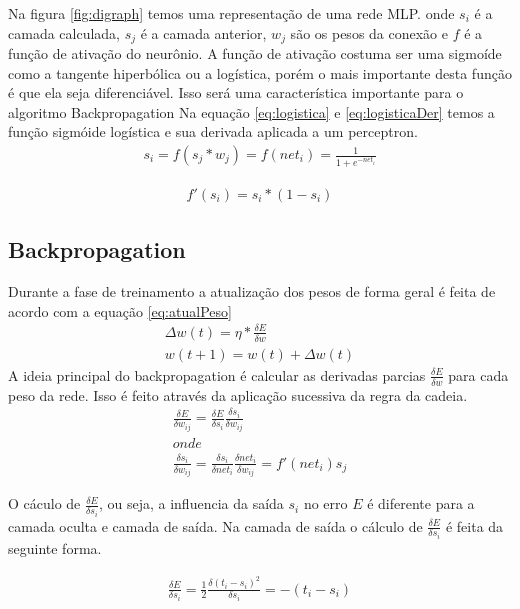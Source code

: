 \documentclass[
	article,			%
	11pt,				%
	oneside,			%
	a4paper,			%
	english,			%
	brazil,				%
	sumario=tradicional
	]{abntex2}
\begin{document}
Na figura \ref{fig:digraph} temos uma representação de uma rede MLP.
onde $s_i$ é a camada calculada, $s_j$ é a camada anterior, $w_j$ são os pesos
da conexão e $f$ é a função de ativação do neurônio. A função de ativação
costuma ser uma sigmoíde como a tangente hiperbólica ou a logística, porém o
mais importante desta função é que ela seja diferenciável. Isso será uma
característica importante para o algoritmo Backpropagation Na equação
\ref{eq:logistica} e \ref{eq:logisticaDer} temos a função sigmóide logística e
sua derivada aplicada a um perceptron.
\begin{align}
	s_i=f(s_j*w_j)=f(net_i)=\frac{1}{1+e^{-net_i}}
\label{eq:logistica}
\end{align}

\begin{align}
	f'(s_i)=s_i*(1-s_i)
\label{eq:logisticaDer}
\end{align} 

\subsection{Backpropagation}
Durante a fase de treinamento a atualização dos pesos de forma geral é feita de
acordo com a equação \ref{eq:atualPeso}
\begin{align}
	\Delta w(t)= \eta*\frac{\delta E}{\delta w} \\
	w(t+1)=w(t)+\Delta w(t)
\label{eq:atualPeso}
\end{align}
A ideia principal do backpropagation é calcular as derivadas parcias
$\frac{\delta E}{\delta w}$ para cada peso da rede. Isso é feito através da
aplicação sucessiva da regra da cadeia.
\begin{align}
\frac{\delta E}{\delta w_{ij}}=
\frac{\delta E}{\delta s_i}
\frac{\delta s_i}{\delta w_{ij}}
\\ onde \\
\frac{\delta s_i}{\delta w_{ij}}=
\frac{\delta s_i}{\delta net_i}
\frac{\delta net_i}{\delta w_{ij}}=
f'(net_i)s_j
\end{align}

O cáculo de $\frac{\delta E}{\delta s_i}$, ou seja, a influencia da saída
$s_i$ no erro $E$ é diferente para a camada oculta e camada de saída.
Na camada de saída o cálculo de $\frac{\delta E}{\delta s_i}$ é feita da
seguinte forma.

\begin{align}
\frac{\delta E}{\delta s_i}=
\frac{1}{2}\frac{\delta (t_i-s_i)^2}{\delta s_i}=-(t_i-s_i)
\end{align}
\end{document}
